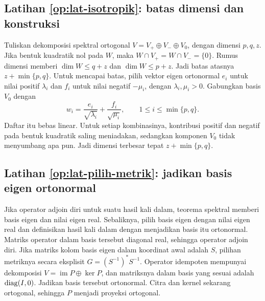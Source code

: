 \subsection*{Latihan \ref{op:lat-isotropik}: batas dimensi dan konstruksi}
Tuliskan dekomposisi spektral ortogonal
$V=V_+\oplus V_-\oplus V_0$, dengan dimensi $p,q,z$.
Jika bentuk kuadratik nol pada $W$, maka
$W\cap V_+=W\cap V_-=\{0\}$.
Rumus dimensi memberi $\dim W\le q+z$ dan $\dim W\le p+z$.
Jadi batas atasnya $z+\min\{p,q\}$.
Untuk mencapai batas, pilih vektor eigen ortonormal $e_i$ untuk
nilai positif $\lambda_i$ dan $f_i$ untuk nilai negatif $-\mu_i$,
dengan $\lambda_i,\mu_i>0$.
Gabungkan basis $V_0$ dengan
\[
    w_i=\frac{e_i}{\sqrt{\lambda_i}}+
        \frac{f_i}{\sqrt{\mu_i}},\qquad 1\le i\le\min\{p,q\}.
\]
Daftar itu bebas linear. Untuk setiap kombinasinya, kontribusi
positif dan negatif pada bentuk kuadratik saling meniadakan,
sedangkan komponen $V_0$ tidak menyumbang apa pun.
Jadi dimensi terbesar tepat $z+\min\{p,q\}$.

\subsection*{Latihan \ref{op:lat-pilih-metrik}: jadikan basis eigen ortonormal}
Jika operator adjoin diri untuk suatu hasil kali dalam,
teorema spektral memberi basis eigen dan nilai eigen real.
Sebaliknya, pilih basis eigen dengan nilai eigen real dan
definisikan hasil kali dalam dengan menjadikan basis itu ortonormal.
Matriks operator dalam basis tersebut diagonal real, sehingga
operator adjoin diri.
Jika matriks kolom basis eigen dalam koordinat awal adalah $S$,
pilihan metriknya secara eksplisit
$G=(S^{-1})^*S^{-1}$.
Operator idempoten mempunyai dekomposisi
$V=\operatorname{im}P\oplus\ker P$, dan matriksnya dalam basis
yang sesuai adalah $\operatorname{diag}(I,0)$.
Jadikan basis tersebut ortonormal. Citra dan kernel sekarang
ortogonal, sehingga $P$ menjadi proyeksi ortogonal.
\fi
